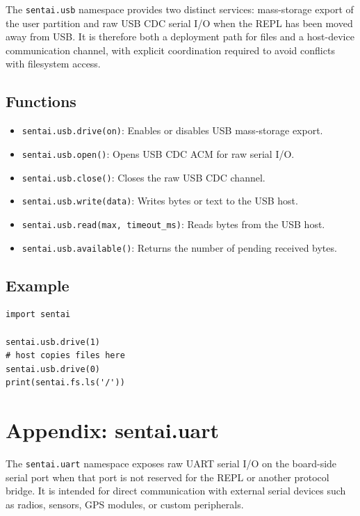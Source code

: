 The \texttt{sentai.usb} namespace provides two distinct services:
mass-storage export of the user partition and raw USB CDC serial I/O
when the REPL has been moved away from USB. It is therefore both a
deployment path for files and a host-device communication channel, with
explicit coordination required to avoid conflicts with filesystem
access.

\subsection{Functions}\label{functions-8}

\begin{itemize}
\tightlist
\item
  \texttt{sentai.usb.drive(on)}: Enables or disables USB mass-storage
  export.
\item
  \texttt{sentai.usb.open()}: Opens USB CDC ACM for raw serial I/O.
\item
  \texttt{sentai.usb.close()}: Closes the raw USB CDC channel.
\item
  \texttt{sentai.usb.write(data)}: Writes bytes or text to the USB host.
\item
  \texttt{sentai.usb.read(max,\ timeout\_ms)}: Reads bytes from the USB
  host.
\item
  \texttt{sentai.usb.available()}: Returns the number of pending
  received bytes.
\end{itemize}

\subsection{Example}\label{example-8}

\begin{verbatim}
import sentai

sentai.usb.drive(1)
# host copies files here
sentai.usb.drive(0)
print(sentai.fs.ls('/'))
\end{verbatim}

\section{Appendix: sentai.uart}\label{appendix-sentai.uart}

The \texttt{sentai.uart} namespace exposes raw UART serial I/O on the
board-side serial port when that port is not reserved for the REPL or
another protocol bridge. It is intended for direct communication with
external serial devices such as radios, sensors, GPS modules, or custom
peripherals.

